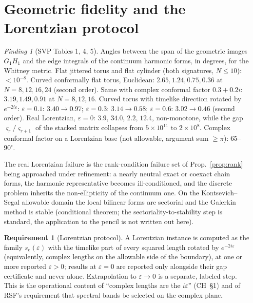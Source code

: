\documentclass[11pt]{article}
\theoremstyle{definition}
\newtheorem{requirement}{Requirement}[section]
\theoremstyle{plain}
\theoremstyle{remark}
\newtheorem{finding}{Finding}[section]
\begin{document}
\section{Geometric fidelity and the Lorentzian protocol}\label{sec:lorentz}

\begin{finding}[SVP Tables 1, 4, 5]
Angles between the span of the geometric images \(G_1H_1\) and the edge integrals of the continuum harmonic forms, in degrees, for the Whitney metric. Flat jittered torus and flat cylinder (both signatures, \(N\le10\)): \(<10^{-8}\). Curved conformally flat torus, Euclidean: \(2.65,1.24,0.75,0.36\) at \(N=8,12,16,24\) (second order). Same with complex conformal factor \(0.3+0.2i\): \(3.19,1.49,0.91\) at \(N=8,12,16\). Curved torus with timelike direction rotated by \(e^{-2i\varepsilon}\): \(\varepsilon=0.1\): \(3.40\to0.97\); \(\varepsilon=0.3\): \(3.14\to0.58\); \(\varepsilon=0.6\): \(3.02\to0.46\) (second order). Real Lorentzian, \(\varepsilon=0\): \(3.9,\,34.0,\,2.2,\,12.4\), non-monotone, while the gap \(\varsigma_r/\varsigma_{r+1}\) of the stacked matrix collapses from \(5\times10^{11}\) to \(2\times10^{8}\). Complex conformal factor on a Lorentzian base (not allowable, argument sum \(\ge\pi\)): \(65\)--\(90^{\circ}\).
\end{finding}

The real Lorentzian failure is the rank-condition failure set of Prop.~\ref{prop:rank} being approached under refinement: a nearly neutral exact or coexact chain forms, the harmonic representative becomes ill-conditioned, and the discrete problem inherits the non-ellipticity of the continuum one. On the Kontsevich--Segal allowable domain the local bilinear forms are sectorial and the Galerkin method is stable (conditional theorem; the sectoriality-to-stability step is standard, the application to the pencil is not written out here).

\begin{requirement}[Lorentzian protocol]\label{req:lorentz}
A Lorentzian instance is computed as the family \(s_e(\varepsilon)\) with the timelike part of every squared length rotated by \(e^{-2i\varepsilon}\) (equivalently, complex lengths on the allowable side of the boundary), at one or more reported \(\varepsilon>0\); results at \(\varepsilon=0\) are reported only alongside their gap certificate and never alone. Extrapolation to \(\varepsilon\to0\) is a separate, labeled step. This is the operational content of ``complex lengths are the \(i\varepsilon\)'' (CH~\S1) and of RSF's requirement that spectral bands be selected on the complex plane.
\end{requirement}
\end{document}
